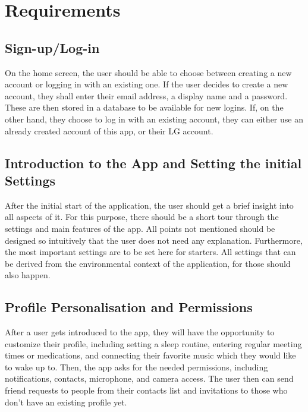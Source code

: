 \documentclass[conference]{IEEEtran}
\begin{document}
\section{Requirements}

\subsection{Sign-up/Log-in}

On the home screen, the user should be able to choose between creating a new account or logging in with an existing one. 
If the user decides to create a new account, they shall enter their email address, a display name and a password. These are then stored in a database to be available for new logins.
If, on the other hand, they choose to log in with an existing account, they can either use an already created account of this app, or their LG account.

\subsection{Introduction to the App and Setting the initial Settings}
After the initial start of the application, the user should get a brief insight into all aspects of it. For this purpose, there should be a short tour through the settings and main features of the app. All points not mentioned should be designed so intuitively that the user does not need any explanation.
Furthermore, the most important settings are to be set here for starters. All settings that can be derived from the environmental context of the application, for those should also happen.

\subsection{Profile Personalisation and Permissions}
After a user gets introduced to the app, they will have the opportunity to customize their profile, including setting a sleep routine, entering regular meeting times or medications, and connecting their favorite music which they would like to wake up to. Then, the app asks for the needed permissions, including notifications, contacts, microphone, and camera access. The user then can send friend requests to people from their contacts list and invitations to those who don’t have an existing profile yet.
\end{document}
